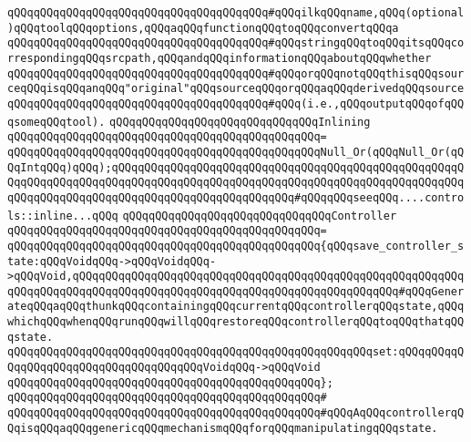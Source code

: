 \verb|qQQqqQQqqQQqqQQqqQQqqQQqqQQqqQQqqQQqqQQq#qQQqilkqQQqname,qQQq(optional)qQQqtoolqQQqoptions,qQQqaqQQqfunctionqQQqtoqQQqconvertqQQqa|\newline
\verb|qQQqqQQqqQQqqQQqqQQqqQQqqQQqqQQqqQQqqQQq#qQQqstringqQQqtoqQQqitsqQQqcorrespondingqQQqsrcpath,qQQqandqQQqinformationqQQqaboutqQQqwhether|\newline
\verb|qQQqqQQqqQQqqQQqqQQqqQQqqQQqqQQqqQQqqQQq#qQQqorqQQqnotqQQqthisqQQqsourceqQQqisqQQqanqQQq"original"qQQqsourceqQQqorqQQqaqQQqderivedqQQqsource|\newline
\verb|qQQqqQQqqQQqqQQqqQQqqQQqqQQqqQQqqQQqqQQq#qQQq(i.e.,qQQqoutputqQQqofqQQqsomeqQQqtool).|\newline
\newline
\newline
\verb|qQQqqQQqqQQqqQQqqQQqqQQqqQQqqQQqInlining|\newline
\verb|qQQqqQQqqQQqqQQqqQQqqQQqqQQqqQQqqQQqqQQqqQQqqQQq=|\newline
\verb|qQQqqQQqqQQqqQQqqQQqqQQqqQQqqQQqqQQqqQQqqQQqqQQqNull_Or(qQQqNull_Or(qQQqIntqQQq)qQQq);qQQqqQQqqQQqqQQqqQQqqQQqqQQqqQQqqQQqqQQqqQQqqQQqqQQqqQQqqQQqqQQqqQQqqQQqqQQqqQQqqQQqqQQqqQQqqQQqqQQqqQQqqQQqqQQqqQQqqQQqqQQqqQQqqQQqqQQqqQQqqQQqqQQqqQQqqQQqqQQqqQQqqQQq#qQQqqQQqseeqQQq....controls::inline...qQQq|\newline
\newline
\newline
\verb|qQQqqQQqqQQqqQQqqQQqqQQqqQQqqQQqController|\newline
\verb|qQQqqQQqqQQqqQQqqQQqqQQqqQQqqQQqqQQqqQQqqQQqqQQq=|\newline
\verb|qQQqqQQqqQQqqQQqqQQqqQQqqQQqqQQqqQQqqQQqqQQqqQQq{qQQqsave_controller_state:qQQqVoidqQQq->qQQqVoidqQQq->qQQqVoid,qQQqqQQqqQQqqQQqqQQqqQQqqQQqqQQqqQQqqQQqqQQqqQQqqQQqqQQqqQQqqQQqqQQqqQQqqQQqqQQqqQQqqQQqqQQqqQQqqQQqqQQqqQQqqQQqqQQqqQQq#qQQqGenerateqQQqaqQQqthunkqQQqcontainingqQQqcurrentqQQqcontrollerqQQqstate,qQQqwhichqQQqwhenqQQqrunqQQqwillqQQqrestoreqQQqcontrollerqQQqtoqQQqthatqQQqstate.|\newline
\verb|qQQqqQQqqQQqqQQqqQQqqQQqqQQqqQQqqQQqqQQqqQQqqQQqqQQqqQQqset:qQQqqQQqqQQqqQQqqQQqqQQqqQQqqQQqqQQqqQQqVoidqQQq->qQQqVoid|\newline
\verb|qQQqqQQqqQQqqQQqqQQqqQQqqQQqqQQqqQQqqQQqqQQqqQQq};|\newline
\verb|qQQqqQQqqQQqqQQqqQQqqQQqqQQqqQQqqQQqqQQqqQQqqQQq#|\newline
\verb|qQQqqQQqqQQqqQQqqQQqqQQqqQQqqQQqqQQqqQQqqQQqqQQq#qQQqAqQQqcontrollerqQQqisqQQqaqQQqgenericqQQqmechanismqQQqforqQQqmanipulatingqQQqstate.|\newline
